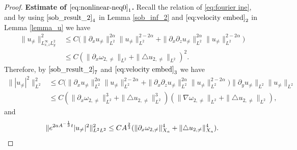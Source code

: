 \documentclass[12pt, reqno]{amsart}
\numberwithin{equation}{section}
\begin{document}
	\begin{proof}
		{\bf Estimate of $\eqref{eq:nonlinear-neq0}_1$.} Recall the relation of \eqref{eq:fourier ine}, and 	
		by using $\eqref{sob_result_2}_4$ in Lemma \ref{sob_inf_2} and $\eqref{eq:velocity embed}_2$ in Lemma \ref{lemma_u} we have
		\begin{align*}
			\|u_{\neq}\|_{L^{\infty}_{x,z}L^2_y}^2
			&\leq C\big(\|\partial_xu_{\neq}\|^{2\alpha}_{L^2}
			\|u_{\neq}\|^{2-2\alpha}_{L^2}
			+\|\partial_x\partial_zu_{\neq}\|^{2\alpha}_{L^2}
			\|u_{\neq}\|^{2-2\alpha}_{L^2}\big)\\
			&\leq C(\|\partial_x\omega_{2,\neq}\|_{L^2}+\|\triangle u_{2,\neq}\|_{L^2})^2.
		\end{align*}
		Therefore, by $\eqref{sob_result_2}_7$ and $\eqref{eq:velocity embed}_3$ we have  
		\begin{equation*}
			\begin{aligned}
				\||u_{\neq}|^2\|_{L^2}^2&\leq
				C\big(\|\partial_xu_{\neq}\|^{2\alpha}_{L^2}
				\|u_{\neq}\|^{2-2\alpha}_{L^2}
				+\|\partial_x\partial_zu_{\neq}\|^{2\alpha}_{L^2}
				\|u_{\neq}\|^{2-2\alpha}_{L^2}\big)\|\partial_yu_{\neq}\|_{L^2}\|u_{\neq}\|_{L^2}\\
				&\leq C(\|\partial_x\omega_{2,\neq}\|^3_{L^2}+\|\triangle u_{2,\neq}\|_{L^2}^3)(\|\nabla\omega_{2,\neq}\|_{L^2}+\|\triangle u_{2,\neq}\|_{L^2}),
			\end{aligned}
		\end{equation*}
		and 
		$$\|{\rm e}^{2aA^{-\frac{1}{3}}t}|u_{\neq}|^2\|_{L^2L^2}^2\leq CA^{\frac{2}{3}}(\|\partial_x\omega_{2,\neq}\|^4_{X_a}+\|\triangle u_{2,\neq}\|^4_{X_a}). $$	
		

\end{proof}
\end{document}
